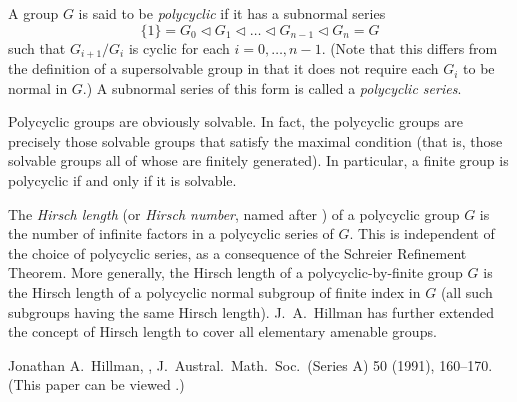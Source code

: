 \documentclass[12pt]{article}
\def\normal{\triangleleft}
\begin{document}

A group $G$ is said to be \emph{polycyclic} if it has a subnormal series
\[\{1\}=G_0\normal G_1\normal\dots\normal G_{n-1}\normal G_n=G\]
such that $G_{i+1}/G_i$ is cyclic for each $i=0,\dots,n-1$.
(Note that this differs from the definition of a supersolvable group in that it does not require each $G_i$ to be normal in $G$.)
A subnormal series of this form is called a \emph{polycyclic series}.

Polycyclic groups are obviously solvable.
In fact, the polycyclic groups are precisely those solvable groups that satisfy the maximal condition (that is, those solvable groups all of whose  are finitely generated).
In particular, a finite group is polycyclic if and only if it is solvable.

The \emph{Hirsch length} (or \emph{Hirsch number}, named after )
of a polycyclic group $G$ is the number of infinite factors in a polycyclic series of $G$.
This is independent of the choice of polycyclic series, as a consequence of the Schreier Refinement Theorem.
More generally, the Hirsch length of a polycyclic-by-finite group $G$ is the Hirsch length of a polycyclic normal subgroup of finite index in $G$ (all such subgroups having the same Hirsch length).
J.~A.~Hillman\cite{hillman} has further extended the concept of Hirsch length to cover all elementary amenable groups.

\begin{thebibliography}{9}
 Jonathan A.~Hillman,
 ,
 J.\ Austral.\ Math.\ Soc.\ (Series A) 50 (1991), 160--170.
 (This paper can be viewed .)
\end{thebibliography}
\end{document}
